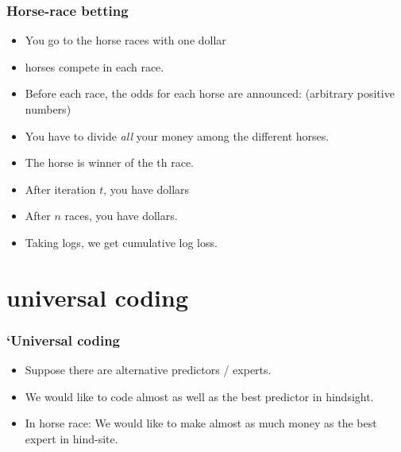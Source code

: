 \documentclass{beamer}
\begin{document}
\begin{frame}
\frametitle{Horse-race betting}
\begin{itemize}
\item You go to the horse races with one dollar 
\item {} horses compete in each race.
\item Before each race, the odds for each horse are announced:
   (arbitrary positive numbers)
\item You have to divide {\em all} your money among the different
  horses. 
\item The horse   is winner of the th race.
\item After iteration $t$, you have
   dollars
\item After $n$ races, you have
   dollars.
\item Taking logs, we get cumulative log loss.
\end{itemize}
\end{frame}



\section{universal coding}

\begin{frame}
\frametitle{`Universal coding}
\begin{itemize}
\item Suppose there are  alternative predictors / experts.
\item We would like to code almost as well as the best predictor in hindsight.
\item In horse race: We would like to make almost as much money as the best expert in hind-site.
\end{itemize}
\end{frame}
\end{document}

